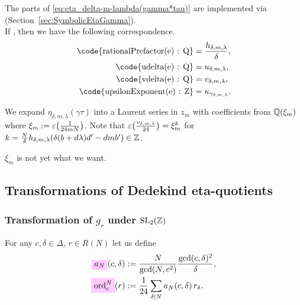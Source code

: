 \documentclass{article}
\begin{document}
The parts of \eqref{eq:eta_delta-m-lambda(gamma*tau)} are implemented
via \textcolor{blue}{}
(Section~\ref{sec:SymbolicEtaGamma}).
\\
If , then we have the
following correspondence.
\begin{align*}
  \text{\code{rationalPrefactor(e) : Q}}
  &=
    \frac{h_{\delta,m,\lambda}}{\delta},
  \\
  \text{\code{udelta(e) : Q}}
  &=
    u_{\delta,m,\lambda},
  \\
  \text{\code{vdelta(e) : Q}}
  &=
    v_{\delta,m,\lambda},
  \\
  \text{\code{upsilonExponent(e) : Z}}
  &=
    \kappa_{\gamma_{\delta,m,\lambda}}.
\end{align*}



We expand $\eta_{\delta,m,\lambda}(\gamma \tau)$ into a Laurent series
in $z_m$ with coefficients from $\mathbb{Q}(\xi_m)$ where
$\xi_m := \varepsilon\!\left(\frac{1}{24 m N}\right)$. Note that
$\varepsilon\!\left(\frac{v_{\delta,m,\lambda}}{24}\right)=\xi_m^k$ for
$k=\frac{N}{\delta} h_{\delta,m,\lambda}(\delta (b + d \lambda) d' - d
m b') \in \mathbb{Z}$.
\begin{Hemmecke}
  $\xi_m$ is not yet what we want.
\end{Hemmecke}






\subsection{Transformations of Dedekind eta-quotients}

\subsubsection{Transformation of $g_r$ under $\SL2Z$}
\label{sec:g_r-transformation}

\begin{Definition}
  For any $c, \delta \in\Delta$, $r\in R(N)$ let us define
  \begin{align}
    \defineNotation[a-N]{a_N}(c, \delta)
    &:= \frac{N}{\gcd(N, c^2)} \frac{\gcd(c,\delta)^2}{\delta},
      \notag\\
    \defineNotation[ord-c-N]{\ord_c^N}(r)
    &:= \frac{1}{24}\divisorsum{N} a_N(c, \delta) \, r_\delta.
    \label{eq:order-r}
  \end{align}
\end{Definition}
\end{document}
